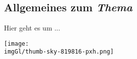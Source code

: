 
    
\subsection{Allgemeines zum \textit{Thema}}

Hier geht es um ...

\begin{center}
  \texttt{[image: \\imgGl/thumb-sky-819816-pxh.png]}
\end{center}
